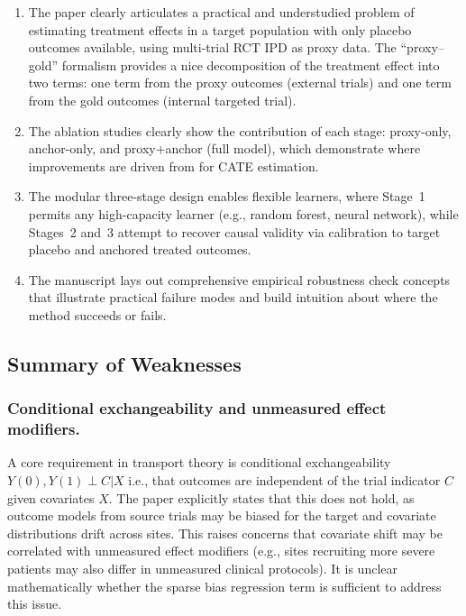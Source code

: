 \begin{enumerate}[label=\arabic*.]

\item The paper clearly articulates a practical and understudied problem of estimating treatment effects in a target population with only placebo outcomes available, using multi-trial RCT IPD as proxy data. The ``proxy--gold'' formalism provides a nice decomposition of the treatment effect into two terms: one term from the proxy outcomes (external trials) and one term from the gold outcomes (internal targeted trial).

\item The ablation studies clearly show the contribution of each stage: proxy-only, anchor-only, and proxy+anchor (full model), which demonstrate where improvements are driven from for CATE estimation.

\item The modular three-stage design enables flexible learners, where Stage~1 permits any high-capacity learner (e.g., random forest, neural network), while Stages~2 and~3 attempt to recover causal validity via calibration to target placebo and anchored treated outcomes.

\item The manuscript lays out comprehensive empirical robustness check concepts that illustrate practical failure modes and build intuition about where the method succeeds or fails.

\end{enumerate}

\subsection*{Summary of Weaknesses}

\subsubsection{Conditional exchangeability and unmeasured effect modifiers.}  
A core requirement in transport theory is conditional exchangeability $Y(0), Y(1) \perp C|X$ i.e., that outcomes are independent of the trial indicator $C$ given covariates $X$. The paper explicitly states that this does not hold, as outcome models from source trials may be biased for the target and covariate distributions drift across sites. This raises concerns that covariate shift may be correlated with unmeasured effect modifiers (e.g., sites recruiting more severe patients may also differ in unmeasured clinical protocols). It is unclear mathematically whether the sparse bias regression term is sufficient to address this issue.\\

